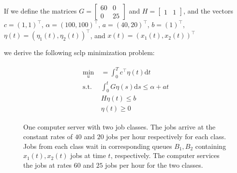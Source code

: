 \documentclass[11pt,a4paper,titlepage]{article}
\theoremstyle{definition}
\theoremstyle{plain}
\begin{document}
{    If we define the matrices
    $
        G =
        \begin{bmatrix}
            60 & 0 \\
            0 & 25
        \end{bmatrix}
    $
    and
    $
        H =
        \begin{bmatrix}
            1 & 1
        \end{bmatrix}
    $,
    and the vectors
    $
        c = (1,1)^\top
    $,
    $
        \alpha = (100,100)^\top
    $,
    $
        a = (40,20)^\top
    $,
    $
        b = (1)^\top
    $,
    $
        \eta(t) = (\eta_1(t), \eta_2(t))^\top
    $,
    and
    $
        x(t) = (x_1(t), x_2(t))^\top
    $

    we derive the following \gls{sclp} minimization problem:

    \begin{align}
    \begin{split}
        \min\limits_{u}
            &~ = \int_0^T c^\top \eta(t) \mathrm{d}t \\
        \text{s.t.}
            &~ \int_0^t G \eta(s) \mathrm{d}s \leq \alpha + a t \\
            &~ H \eta(t) \leq b \\
            &~ \eta(t) \geq 0
    \end{split}
    \end{align}

    \begin{figure}
        \centering
        \caption[One computer with two job classes.]{
            \label{fig:one-computer-two-classes-concrete}
            One computer server with two job classes.
            The jobs arrive at the constant rates of
            $40$ and $20$ jobs per hour respectively for each class.
            Jobs from each class wait in corresponding queues $B_1, B_2$
            containing $x_1(t), x_2(t)$ jobs at time $t$, respectively.
            The computer services the jobs at rates
            $60$ and $25$ jobs per hour for the two classes.
        }
    \end{figure}
}
\end{document}
